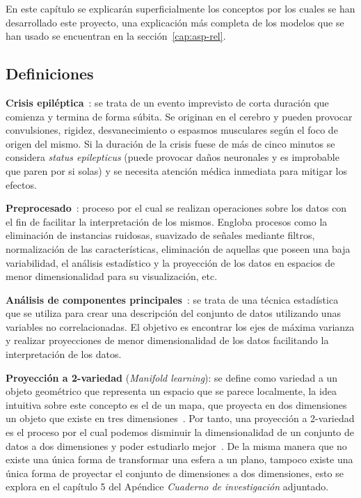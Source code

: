 
En este capítulo se explicarán superficialmente los conceptos por los cuales se han desarrollado este proyecto, una explicación más completa de los modelos que se han usado se encuentran en la sección~\ref{cap:asp-rel}.

\subsection{Definiciones}

\textbf{Crisis epiléptica}~\cite{epilepsia}: se trata de un evento imprevisto de corta duración que comienza y termina de forma súbita. Se originan en el cerebro y pueden provocar convulsiones, rigidez, desvanecimiento o espasmos musculares según el foco de origen del mismo. Si la duración de la crisis fuese de más de cinco minutos se considera \textit{status epilepticus} (puede provocar daños neuronales y es improbable que paren por si solas) y se necesita atención médica inmediata para mitigar los efectos.

\textbf{Preprocesado}~\cite{ubu:mineria1}: proceso por el cual se realizan operaciones sobre los datos con el fin de facilitar la interpretación de los mismos. Engloba procesos como la eliminación de instancias ruidosas, suavizado de señales mediante filtros, normalización de las características, eliminación de aquellas que poseen una baja variabilidad, el análisis estadístico y la proyección de los datos en espacios de menor dimensionalidad para su visualización, etc.

\textbf{Análisis de componentes principales}~\cite{wiki:pca}: se trata de una técnica estadística que se utiliza para crear una descripción del conjunto de datos utilizando unas variables no correlacionadas. El objetivo es encontrar los ejes de máxima varianza y realizar proyecciones de menor dimensionalidad de los datos facilitando la interpretación de los datos.

\textbf{Proyección a 2-variedad} (\textit{Manifold learning}): se define como variedad a un objeto geométrico que representa un espacio que se parece localmente, la idea intuitiva sobre este concepto es el de un mapa, que proyecta en dos dimensiones un objeto que existe en tres dimensiones~\cite{wiki:manifold}. Por tanto, una proyección a 2-variedad es el proceso por el cual podemos disminuir la dimensionalidad de un conjunto de datos a dos dimensiones y poder estudiarlo mejor~\cite{tool:scikit-learn}. De la misma manera que no existe una única forma de transformar una esfera a un plano, tampoco existe una única forma de proyectar el conjunto de dimensiones a dos dimensiones, esto se explora en el capítulo 5 del Apéndice \textit{Cuaderno de investigación} adjuntado.

